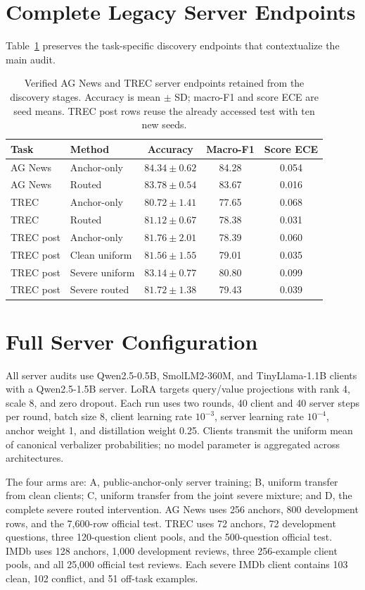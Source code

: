 \documentclass[letterpaper]{article}
\begin{document}
\section{Complete Legacy Server Endpoints}
Table~\ref{tab:legacy-endpoints} preserves the task-specific discovery
endpoints that contextualize the main audit.
\begin{table}[t]
\centering
\small
\setlength{\tabcolsep}{3pt}
\begin{tabular}{llccc}
\toprule
Task & Method & Accuracy & Macro-F1 & Score ECE\\
\midrule
AG News & Anchor-only & \(84.34\pm0.62\) & 84.28 & 0.054\\
AG News & Routed & \(83.78\pm0.54\) & 83.67 & 0.016\\
TREC & Anchor-only & \(80.72\pm1.41\) & 77.65 & 0.068\\
TREC & Routed & \(81.12\pm0.67\) & 78.38 & 0.031\\
\midrule
TREC post & Anchor-only & \(81.76\pm2.01\) & 78.39 & 0.060\\
TREC post & Clean uniform & \(81.56\pm1.55\) & 79.01 & 0.035\\
TREC post & Severe uniform & \(83.14\pm0.77\) & 80.80 & 0.099\\
TREC post & Severe routed & \(81.72\pm1.38\) & 79.43 & 0.039\\
\bottomrule
\end{tabular}
\caption{Verified AG News and TREC server endpoints retained from the discovery
stages. Accuracy is mean \(\pm\) SD; macro-F1 and score ECE are seed means.
TREC post rows reuse the already accessed test with ten new seeds.}
\label{tab:legacy-endpoints}
\end{table}

\section{Full Server Configuration}
All server audits use Qwen2.5-0.5B, SmolLM2-360M, and TinyLlama-1.1B clients
with a Qwen2.5-1.5B server.  LoRA targets query/value projections with rank 4,
scale 8, and zero dropout.  Each run uses two rounds, 40 client and 40 server
steps per round, batch size 8, client learning rate \(10^{-3}\), server learning
rate \(10^{-4}\), anchor weight 1, and distillation weight 0.25.  Clients
transmit the uniform mean of canonical verbalizer probabilities; no model
parameter is aggregated across architectures.

The four arms are: A, public-anchor-only server training; B, uniform transfer
from clean clients; C, uniform transfer from the joint severe mixture; and D,
the complete severe routed intervention.  AG News uses 256 anchors, 800
development rows, and the 7,600-row official test.  TREC uses 72 anchors, 72
development questions, three 120-question client pools, and the 500-question
official test.  IMDb uses 128 anchors, 1,000 development reviews, three
256-example client pools, and all 25,000 official test reviews.  Each severe
IMDb client contains 103 clean, 102 conflict, and 51 off-task examples.
\end{document}

